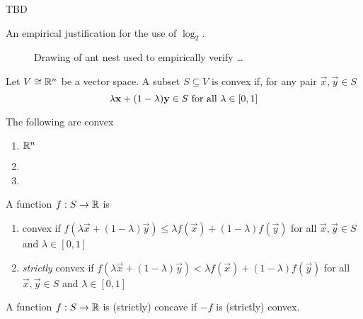 \begin{example}
    TBD
\end{example}

An empirical justification for the use of $\log_2$.

\begin{figure}
    \caption{Drawing of ant nest used to empirically verify \dots}
\end{figure}

\begin{definition}[Convexity]
    Let $V \isomorphic \reals^n$ be a vector space. A subset $S \subseteq V$ is
    convex if, for any pair $\vec{x}, \vec{y} \in S$
    \[\lambda\vec{x} + (1 - \lambda)\vec{y} \in S\hbox{ for all $\lambda \in [0, 1]$}\]
\end{definition}


\begin{example}
    The following are convex
    \begin{enumerate}[label=(\arabic*)]
        \item $\reals^n$
        \item
        \item
    \end{enumerate}
\end{example}

\begin{definition}
    A function $f: S \to \reals$ is
    \begin{enumerate}[label=(\roman*)]
        \item convex if $f\left(\lambda\vec{x} + (1 - \lambda)\vec{y}\right) \leq \lambda f(\vec{x}) + (1 - \lambda)f(\vec{y})$ for all $\vec{x}, \vec{y} \in S$ and $\lambda \in [0, 1]$
        \item \emph{strictly} convex if $f\left(\lambda\vec{x} + (1 - \lambda)\vec{y}\right) < \lambda f(\vec{x}) + (1 - \lambda)f(\vec{y})$ for all $\vec{x}, \vec{y} \in S$ and $\lambda \in [0, 1]$
    \end{enumerate}
\end{definition}

\begin{definition}
    A function $f: S \to \reals$ is (strictly) concave if $-f$ is (strictly) convex.
\end{definition}

